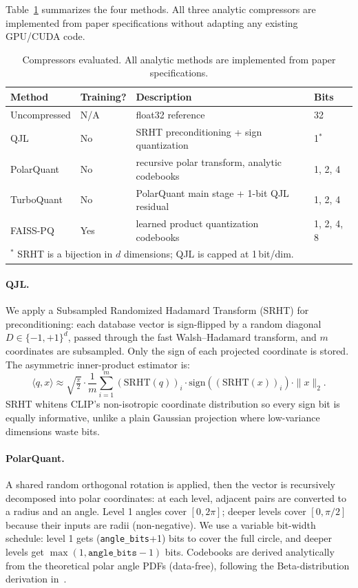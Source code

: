 \documentclass[11pt]{article}
\begin{document}
Table~\ref{tab:methods} summarizes the four methods. All three analytic compressors are implemented from
paper specifications without adapting any existing GPU/CUDA code.

\begin{table}[h!]
  \centering
  \caption{Compressors evaluated. All analytic methods are implemented from paper specifications.}
  \label{tab:methods}
  \small
  \begin{tabularx}{\linewidth}{llXl}
    \toprule
    \textbf{Method} & \textbf{Training?} & \textbf{Description} & \textbf{Bits} \\
    \midrule
    Uncompressed & N/A & float32 reference & 32 \\
    QJL          & No  & SRHT preconditioning + sign quantization & 1$^*$ \\
    PolarQuant   & No  & recursive polar transform, analytic codebooks & 1, 2, 4 \\
    TurboQuant   & No  & PolarQuant main stage + 1-bit QJL residual & 1, 2, 4 \\
    FAISS-PQ     & Yes & learned product quantization codebooks & 1, 2, 4, 8 \\
    \bottomrule
    \multicolumn{4}{l}{\footnotesize $^*$ SRHT is a bijection in $d$ dimensions; QJL is capped at 1\,bit/dim.}
  \end{tabularx}
\end{table}

\paragraph{QJL.}
We apply a Subsampled Randomized Hadamard Transform (SRHT) for preconditioning: each database vector is
sign-flipped by a random diagonal $D \in \{-1,+1\}^d$, passed through the fast Walsh--Hadamard transform,
and $m$ coordinates are subsampled. Only the sign of each projected coordinate is stored. The asymmetric
inner-product estimator is:
\[
    \langle q, x \rangle \approx \sqrt{\tfrac{\pi}{2}} \cdot \frac{1}{m}
    \sum_{i=1}^{m} (\mathrm{SRHT}(q))_i \cdot \mathrm{sign}((\mathrm{SRHT}(x))_i) \cdot \|x\|_2.
\]
SRHT whitens CLIP's non-isotropic coordinate distribution so every sign bit is equally informative,
unlike a plain Gaussian projection where low-variance dimensions waste bits.

\paragraph{PolarQuant.}
A shared random orthogonal rotation is applied, then the vector is recursively decomposed into polar
coordinates: at each level, adjacent pairs are converted to a radius and an angle. Level 1 angles cover
$[0, 2\pi]$; deeper levels cover $[0, \pi/2]$ because their inputs are radii (non-negative). We use a
variable bit-width schedule: level 1 gets (\texttt{angle\_bits}+1) bits to cover the full circle, and
deeper levels get $\max(1, \texttt{angle\_bits}-1)$ bits. Codebooks are derived analytically from the
theoretical polar angle PDFs (data-free), following the Beta-distribution derivation in~\cite{han2026polarquant}.
\end{document}
